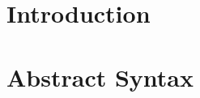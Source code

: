 \documentclass[a4paper]{article}
\title{\documentTitle}
\author{\documentAuthors{}}
\begin{document}
\renewcommand{\figurename}{Figure}
\maketitle
\cleardoublepage

\tableofcontents
\cleardoublepage

\setlength{\parindent}{1cm}
\setlength{\parskip}{0.3cm}

\section{Introduction}
\section{Abstract Syntax}
\end{document}
